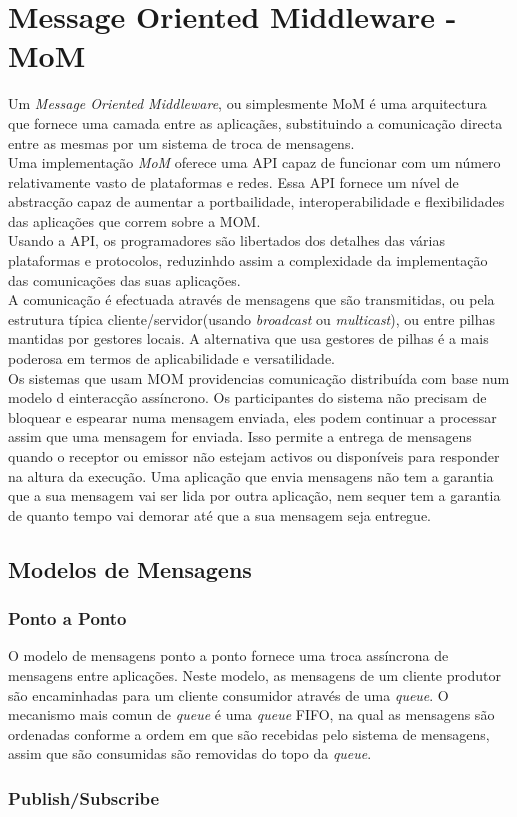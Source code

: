 \section{Message Oriented Middleware - MoM}
Um \textit{Message Oriented Middleware}, ou simplesmente MoM é uma arquitectura que fornece uma camada entre as aplicaçães, substituindo a comunicação directa entre as mesmas por um sistema de troca de mensagens.\\
Uma implementação \textit{MoM} oferece uma API capaz de funcionar com um número relativamente vasto de plataformas e redes. Essa API fornece um nível de abstracção capaz de aumentar a portbailidade, interoperabilidade e flexibilidades das aplicações que correm sobre a MOM.\\
Usando a API, os programadores são libertados dos detalhes das várias plataformas e protocolos, reduzinhdo assim a complexidade da implementação das comunicações das suas aplicações.\\
A comunicação é efectuada através de mensagens que são transmitidas, ou pela estrutura típica cliente/servidor(usando \textit{broadcast} ou \textit{multicast}), ou entre pilhas mantidas por gestores locais. A alternativa que usa gestores de pilhas é a mais poderosa em termos de aplicabilidade e versatilidade.\\ 
Os sistemas que usam MOM providencias comunicação distribuída com base num modelo d einteracção assíncrono. Os participantes do sistema não precisam de bloquear e espearar numa mensagem enviada, eles podem continuar a processar assim que uma mensagem for enviada. Isso permite a entrega de mensagens quando o receptor ou emissor não estejam activos ou disponíveis para responder na altura da execução. Uma aplicação que envia mensagens não tem a garantia que a sua mensagem vai ser lida por outra aplicação, nem sequer tem a garantia de quanto tempo vai demorar até que a sua mensagem seja entregue. 
\subsection{Modelos de Mensagens}
\subsubsection{Ponto a Ponto}
O modelo de mensagens ponto a ponto fornece uma troca assíncrona de mensagens entre aplicações. Neste modelo, as mensagens de um cliente produtor são encaminhadas para um cliente consumidor através de uma \textit{queue}. O mecanismo mais comun de \textit{queue} é uma \textit{queue} FIFO, na qual as mensagens são ordenadas conforme a ordem em que são recebidas pelo sistema de mensagens, assim que são consumidas são removidas do topo da \textit{queue}. 
\subsubsection{Publish/Subscribe}


